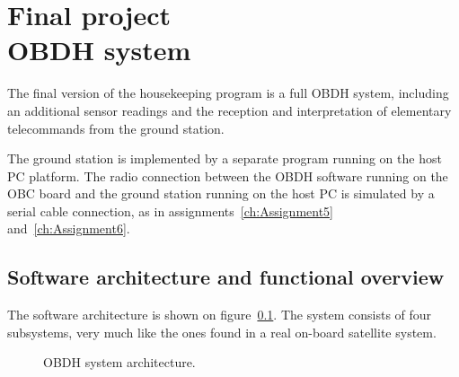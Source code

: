 \chapter*{Final project \\\vspace{7mm} OBDH system}\label{ch:obdh}

The final version of the housekeeping program is a full OBDH system, including an additional sensor readings and the reception and interpretation of elementary telecommands from the ground station.

The ground station is implemented by a separate program running on the host PC platform. The radio connection between the OBDH software running on the OBC board and the ground station running on the host PC is simulated by a serial cable connection, as in assignments~\ref{ch:Assignment5} and~\ref{ch:Assignment6}.

\section{Software architecture and functional overview}

The software architecture is shown on figure~\ref{fig:obdh}. The system consists of four subsystems, very much like the ones found in a real on-board satellite system.

\begin{figure}[h]
            \caption{OBDH system architecture.}
            \label{fig:obdh}
\end{figure}


